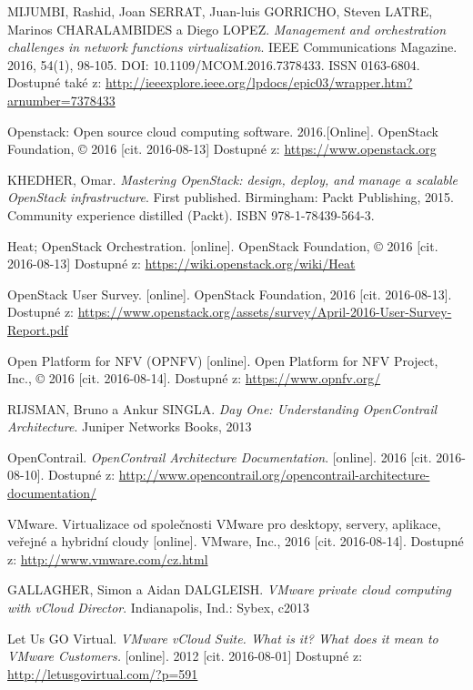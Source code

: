 \begin{thebibliography}{10}
MIJUMBI, Rashid, Joan SERRAT, Juan-luis GORRICHO, Steven LATRE, Marinos CHARALAMBIDES a Diego LOPEZ. \emph{Management and orchestration challenges in network functions virtualization}. IEEE Communications Magazine. 2016, 54(1), 98-105. DOI: 10.1109/MCOM.2016.7378433. ISSN 0163-6804. Dostupné také z: \url{http://ieeexplore.ieee.org/lpdocs/epic03/wrapper.htm?arnumber=7378433}

 Openstack:  Open  source  cloud  computing  software.  2016.[Online]. OpenStack Foundation, © 2016 [cit. 2016-08-13] Dostupné z: \url{https://www.openstack.org}

 KHEDHER, Omar. \emph{Mastering OpenStack: design, deploy, and manage a scalable OpenStack infrastructure}. First published. Birmingham: Packt Publishing, 2015. Community experience distilled (Packt). ISBN 978-1-78439-564-3.

Heat; OpenStack Orchestration. [online]. OpenStack Foundation, © 2016 [cit. 2016-08-13] Dostupné z: \url{https://wiki.openstack.org/wiki/Heat}

 OpenStack User Survey. [online]. OpenStack Foundation, 2016 [cit. 2016-08-13]. Dostupné z: \url{https://www.openstack.org/assets/survey/April-2016-User-Survey-Report.pdf}

 Open Platform for NFV (OPNFV) [online]. Open Platform for NFV Project, Inc., © 2016 [cit. 2016-08-14]. Dostupné z: \url{https://www.opnfv.org/}

 RIJSMAN, Bruno a Ankur SINGLA. \emph{Day One: Understanding OpenContrail Architecture}. Juniper Networks Books, 2013

 OpenContrail. \emph{OpenContrail Architecture Documentation}. [online]. 2016 [cit. 2016-08-10]. Dostupné z: \url{http://www.opencontrail.org/opencontrail-architecture-documentation/}

VMware. Virtualizace od společnosti VMware pro desktopy, servery, aplikace, veřejné a hybridní cloudy [online]. VMware, Inc., 2016 [cit. 2016-08-14]. Dostupné z: \url{http://www.vmware.com/cz.html}

GALLAGHER, Simon a Aidan DALGLEISH. \emph{VMware private cloud computing with vCloud Director}. Indianapolis, Ind.: Sybex, c2013

 Let Us GO Virtual. \emph{VMware vCloud Suite. What is it? What does it mean to VMware Customers.} [online]. 2012 [cit. 2016-08-01] Dostupné z: \url{http://letusgovirtual.com/?p=591}


\end{thebibliography}

